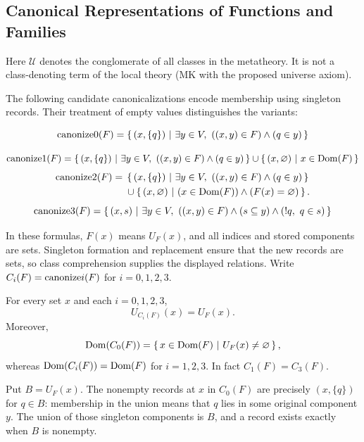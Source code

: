 \subsection{Canonical Representations of Functions and Families}
\begin{definition}
Here $\mathcal{U}$ denotes the conglomerate of all classes in the
metatheory. It is not a class-denoting term of the local theory
(MK with the proposed universe axiom).
\end{definition}
The following candidate canonicalizations encode membership using singleton
records. Their treatment of empty values distinguishes the variants:
\begin{definition}
\[
\mathrm{canonize}0(F) = \left\{\,(x,\{q\})\ \middle|\ \exists y\in V,\ ((x,y)\in F)\land (q\in y)\,\right\}
\]

\end{definition}
\begin{definition}
\[
\mathrm{canonize}1(F) = \left\{\,(x,\{q\})\ \middle|\ \exists y\in V,\ ((x,y)\in F)\land (q\in y)\,\right\}\cup\left\{\,(x,\varnothing)\ \middle|\ x\in\mathrm{Dom}(F)\,\right\}
\]
\[
\begin{aligned}
\mathrm{canonize}2(F) ={}& \left\{\,(x,\{q\})\ \middle|\ \exists y\in V,\ ((x,y)\in F)\land (q\in y)\,\right\}\\
&\cup\left\{\,(x,\varnothing)\ \middle|\ (x\in\mathrm{Dom}(F))\land (F(x)=\varnothing)\,\right\}.
\end{aligned}
\]
\[
\canonize3(F) = \cc{(x,s)}{\exists y\in V,\ ((x,y)\in F)\land (s\subseteq y) \land (!q,\ q\in s)}
\]
\end{definition}

In these formulas, $F(x)$ means $U_F(x)$, and all indices and stored
components are sets. Singleton formation and replacement ensure that the
new records are sets, so class comprehension supplies the displayed
relations. Write $C_i(F)=\mathrm{canonize} i(F)$ for $i=0,1,2,3$.

\begin{theorem}
For every set $x$ and each $i=0,1,2,3$,
\[
U_{C_i(F)}(x)=U_F(x).
\]
Moreover,
\[
\mathrm{Dom}(C_0(F))=\left\{\,x\in\mathrm{Dom}(F)\ \middle|\ U_F(x)\neq\varnothing\,\right\},
\]
whereas $\mathrm{Dom}(C_i(F))=\mathrm{Dom}(F)$ for $i=1,2,3$. In fact
$C_1(F)=C_3(F)$.
\end{theorem}
\Proof
Put $B=U_F(x)$. The nonempty records at $x$ in $C_0(F)$ are precisely
$(x,\{q\})$ for $q\in B$: membership in the union means that $q$ lies in
some original component $y$. The union of those singleton components is
$B$, and a record exists exactly when $B$ is nonempty.

